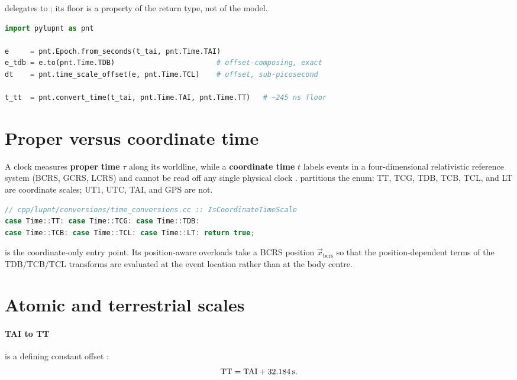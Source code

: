  delegates to ; its floor is a
property of the return type, not of the model.

\begin{lstlisting}[language=py,caption={Choosing an interface in Python.},label={lst:tc-python}]
import pylupnt as pnt

e     = pnt.Epoch.from_seconds(t_tai, pnt.Time.TAI)
e_tdb = e.to(pnt.Time.TDB)                        # offset-composing, exact
dt    = pnt.time_scale_offset(e, pnt.Time.TCL)    # offset, sub-picosecond

t_tt  = pnt.convert_time(t_tai, pnt.Time.TAI, pnt.Time.TT)   # ~245 ns floor
\end{lstlisting}

\section{Proper versus coordinate time}
\label{sec:tc-proper-coordinate}

A clock measures \textbf{proper time} $\tau$ along its worldline, while a
\textbf{coordinate time} $t$ labels events in a four-dimensional relativistic
reference system (BCRS, GCRS, LCRS) and cannot be read off any single physical
clock \citep[Ch.~2.3.1]{iiyama2026thesis}. 
partitions the enum: TT, TCG, TDB, TCB, TCL, and LT are coordinate scales;
UT1, UTC, TAI, and GPS are not.

\begin{lstlisting}[language=cpp]
// cpp/lupnt/conversions/time_conversions.cc :: IsCoordinateTimeScale
case Time::TT: case Time::TCG: case Time::TDB:
case Time::TCB: case Time::TCL: case Time::LT: return true;
\end{lstlisting}

 is the coordinate-only entry point. Its
position-aware overloads take a BCRS position $\vec{x}_{\mathrm{bcrs}}$ so that
the position-dependent terms of the TDB/TCB/TCL transforms are evaluated at the
event location rather than at the body centre.

\section{Atomic and terrestrial scales}
\label{sec:tc-atomic}

\paragraph{TAI to TT} is a defining constant offset
\citep[Eq.~2.38]{iiyama2026thesis}:
%
\begin{equation}
\label{eq:tc-tai-tt}
  \mathrm{TT} = \mathrm{TAI} + \SI{32.184}{\second} .
\end{equation}

